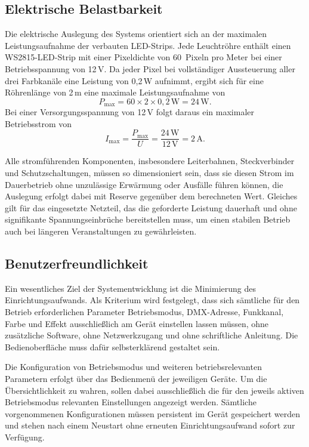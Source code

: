 \subsection{Elektrische Belastbarkeit}
\label{subsec:elektrische-belastbarkeit}

Die elektrische Auslegung des Systems orientiert sich an der maximalen
Leistungsaufnahme der verbauten LED-Strips. Jede Leuchtröhre enthält
einen WS2815-LED-Strip mit einer Pixeldichte von 60~Pixeln pro Meter
bei einer Betriebsspannung von 12\,V. Da jeder Pixel bei vollständiger
Aussteuerung aller drei Farbkanäle eine Leistung von 0{,}2\,W aufnimmt,
ergibt sich für eine Röhrenlänge von 2\,m eine maximale Leistungsaufnahme
von
\[
  P_{\max} = 60 \times 2 \times 0{,}2\,\text{W} = 24\,\text{W}.
\]
Bei einer Versorgungsspannung von 12\,V folgt daraus ein maximaler
Betriebsstrom von
\[
  I_{\max} = \frac{P_{\max}}{U} = \frac{24\,\text{W}}{12\,\text{V}} = 2\,\text{A}.
\]

Alle stromführenden Komponenten, insbesondere Leiterbahnen, Steckverbinder
und Schutzschaltungen, müssen so dimensioniert sein, dass sie diesen Strom im
Dauerbetrieb ohne unzulässige Erwärmung oder Ausfälle führen können, die Auslegung
erfolgt dabei mit Reserve gegenüber dem berechneten Wert. Gleiches gilt für das eingesetzte Netzteil, das die geforderte
Leistung dauerhaft und ohne signifikante Spannungseinbrüche bereitstellen
muss, um einen stabilen Betrieb auch bei längeren Veranstaltungen zu
gewährleisten.

\subsection{Benutzerfreundlichkeit}
\label{subsec:benutzerfreundlichkeit}

Ein wesentliches Ziel der Systementwicklung ist die Minimierung des
Einrichtungsaufwands. Als Kriterium wird festgelegt, dass sich sämtliche für den Betrieb
erforderlichen Parameter Betriebsmodus, DMX-Adresse, Funkkanal, Farbe und Effekt
ausschließlich am Gerät einstellen lassen müssen, ohne zusätzliche Software, ohne
Netzwerkzugang und ohne schriftliche Anleitung. Die Bedienoberfläche muss dafür
selbsterklärend gestaltet sein.

Die Konfiguration von Betriebsmodus und weiteren betriebsrelevanten Parametern
erfolgt über das Bedienmenü der jeweiligen Geräte. Um die Übersichtlichkeit
zu wahren, sollen dabei ausschließlich die für den jeweils aktiven Betriebsmodus
relevanten Einstellungen angezeigt werden. Sämtliche vorgenommenen
Konfigurationen müssen persistent im Gerät gespeichert werden und stehen nach
einem Neustart ohne erneuten Einrichtungsaufwand sofort zur Verfügung.

